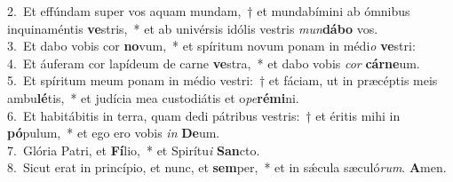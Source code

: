 {2.~}Et effúndam super vos aquam mundam,~† et mundabímini ab ómnibus inquinaméntis \textbf{ve}stris,~* et ab univérsis idólis vestris \textit{mun}\textbf{dá}\textbf{bo} vos.\\
{3.~}Et dabo vobis cor \textbf{no}vum,~* et spíritum novum ponam in médi\textit{o} \textbf{ve}stri:\\
{4.~}Et áuferam cor lapídeum de carne \textbf{ve}stra,~* et dabo vobis \textit{cor} \textbf{cár}\textbf{ne}um.\\
{5.~}Et spíritum meum ponam in médio vestri:~† et fáciam, ut in præcéptis meis ambu\textbf{lé}tis,~* et judícia mea custodiátis et o\textit{pe}\textbf{ré}\textbf{mi}ni.\\
{6.~}Et habitábitis in terra, quam dedi pátribus vestris:~† et éritis mihi in \textbf{pó}pulum,~* et ego ero vobis \textit{in} \textbf{De}um.\\
{7.~}Glória Patri, et \textbf{Fí}lio,~* et Spirítu\textit{i} \textbf{San}cto.\\
{8.~}Sicut erat in princípio, et nunc, et \textbf{sem}per,~* et in sǽcula sæculó\textit{rum}. \textbf{A}men.\\
